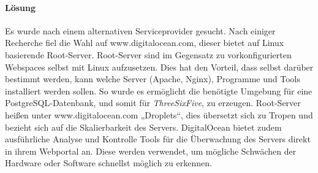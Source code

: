 \paragraph{Lösung}
Es wurde nach einem alternativen Serviceprovider gesucht. Nach einiger Recherche fiel die Wahl auf www.digitalocean.com, dieser bietet auf Linux basierende Root-Server. Root-Server sind im Gegensatz zu vorkonfigurierten Webspaces selbst mit Linux aufzusetzen. Dies hat den Vorteil, dass selbst darüber bestimmt werden, kann welche Server (Apache, Nginx), Programme und Tools installiert werden sollen. So wurde es ermöglicht die benötigte Umgebung für eine PostgreSQL-Datenbank, und somit für \textit{ThreeSixFive}, zu erzeugen. Root-Server heißen unter www.digitalocean.com „Droplets“, dies übersetzt sich zu Tropen und bezieht sich auf die Skalierbarkeit des Servers. DigitalOcean bietet zudem ausführliche Analyse und Kontrolle Tools für die Überwachung des Servers direkt in ihrem Webportal an. Diese werden verwendet, um mögliche Schwächen der Hardware oder Software schnellst möglich zu erkennen.
